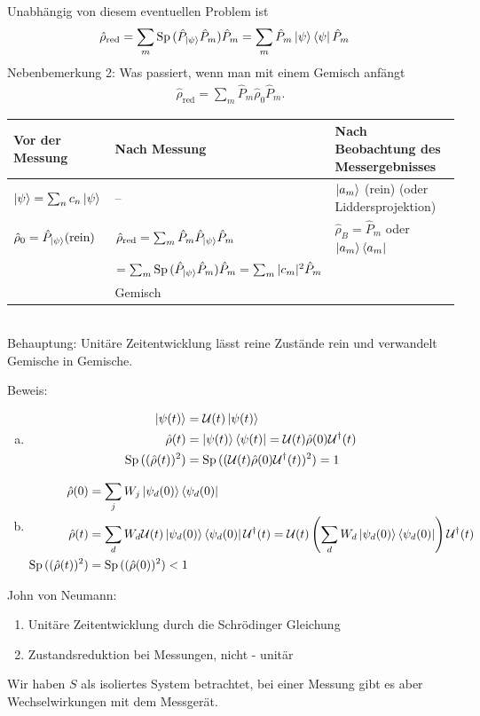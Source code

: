 	Unabhängig von diesem eventuellen Problem ist
		\begin{align*}
			\hat{\rho}_{\text{red}} &= 
			\sum_m \mathrm{Sp}\, (\hat{P}_{\ket{\psi}} \hat{P}_m) \hat{P}_m =
			\sum_m \hat{P}_m \ket{\psi} \bra{\psi} \hat{P}_m 
		\end{align*}
	Nebenbemerkung 2: Was passiert, wenn man mit einem Gemisch anfängt
		\begin{align*}
			\hat{\rho}_{\text{red}} = \sum_m \hat{P}_m \hat{\rho}_0 \hat{P}_m.
		\end{align*}
	\begin{tabular}{l l l}
			Vor der Messung & Nach Messung & Nach Beobachtung des Messergebnisses \\
			\hline  
			$\ket{\psi} = \sum_n c_n \ket{\psi}$
			& -- & 
			$\ket{a_m}$ (rein) (oder Liddersprojektion)
			\\
			$\hat{\rho}_0 = \hat{P}_{\ket{\psi}} (\text{rein})$
			&
			$\hat{\rho}_{\text{red}} = \sum_m \hat{P}_m \hat{P}_{\ket{\psi}} \hat{P}_m$
			& 
			$\hat{\rho}_B = \hat{P}_m$ oder $ \ket{a_m }\bra{a_m}$
			\\
			 & 
			$= \sum_m \mathrm{Sp}\,  (\hat{P}_{\ket{\psi}} \hat{P}_m) \hat{P}_m =
			\sum_m |c_m|^2 \hat{P}_m$  
			& 
			\\
			&
			Gemisch
			&
	\end{tabular} \\
	
	Behauptung: Unitäre Zeitentwicklung lässt reine Zustände rein und verwandelt Gemische in Gemische.
	
	Beweis: 
		\begin{enumerate}[(a)]
			\item \begin{align*}
				\ket{\psi (t)} &= \mathcal{U} (t) \ket{\psi(t)} \\
				\hat{\rho}(t) &= \ket{\psi(t)} \bra{\psi (t)} = 
				\mathcal{U} (t) \hat{\rho}(0) \mathcal{U}^\dagger (t) \\
				\mathrm{Sp}\, ((\hat{\rho}(t))^2) &= 
				\mathrm{Sp}\, ((\mathcal{U} (t) \hat{\rho} (0) \mathcal{U}^\dagger(t))^2) = 1 
			\end{align*}
			\item \begin{align*}
				\hat{\rho}(0) &= \sum_j W_j \ket{\psi_d (0)} \bra{\psi_d (0)} \\
				\hat{\rho}(t) &= \sum_d W_d \mathcal{U} (t) \ket{\psi_d (0)} \bra{\psi_d (0)}
				\mathcal{U}^\dagger(t) =
				\mathcal{U}(t) \left(
					\sum_d W_d \ket{\psi_d (0)} \bra{\psi_d (0)}
				\right) \mathcal{U}^\dagger(t) \\
				\mathrm{Sp}\, ((\hat{\rho}(t))^2) &= 
				\mathrm{Sp}\, ((\hat{\rho}(0))^2) < 1
 			\end{align*}
		\end{enumerate}
	John von Neumann:
		\begin{enumerate}[1.]
			\item Unitäre Zeitentwicklung durch die Schrödinger Gleichung
			\item Zustandsreduktion bei Messungen, nicht - unitär
		\end{enumerate}
	Wir haben $S$ als isoliertes System betrachtet, bei einer Messung gibt es aber Wechselwirkungen mit dem Messgerät.
	

